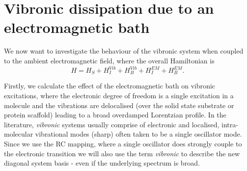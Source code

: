 \documentclass[]{article}
\begin{document}
\section{Vibronic dissipation due to an electromagnetic bath}
We now want to investigate the behaviour of the vibronic system when coupled to the ambient electromagnetic field, where the overall Hamiltonian is
\begin{equation}
H = H_S + H_I^{Vib} + H_B^{Vib} + H_I^{EM}+ H_B^{EM}.
\end{equation}

Firstly, we calculate the effect of the electromagnetic bath on vibronic excitations, where the electronic degree of freedom is a single excitation in a molecule and the vibrations are delocalised (over the solid state substrate or protein scaffold) leading to a broad overdamped Lorentzian profile. In the literature, \textit{vibronic} systems usually comprise of electronic and localised, intra-molecular vibrational modes (sharp) often taken to be a single oscillator mode. Since we use the RC mapping, where a single oscillator does strongly couple to the electronic transition we will also use the term \textit{vibronic} to describe the new diagonal system basis - even if the underlying spectrum is broad.
\end{document}
